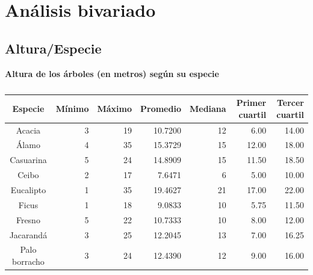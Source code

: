 \documentclass[11pt]{article}
\begin{document}

\newpage
\section{Análisis bivariado}

\subsection{Altura/Especie}

\begin{table}[h!]
  \begin{center}
    \caption*{\textbf{Altura de los árboles (en metros) según su especie}}
    \begin{tabular}{| c | r | r | r | r | r | r |}
      \hline
      \textbf{Especie} & \textbf{Mínimo} & \textbf{Máximo} & \textbf{Promedio} &
      \textbf{Mediana} & \textbf{Primer cuartil} & \textbf{Tercer cuartil}  \\ \hline
      Acacia & 3 & 19 & 10.7200 & 12 & 6.00 & 14.00 \\ \hline
	    Álamo & 4 & 35 & 15.3729 & 15 & 12.00 & 18.00 \\ \hline
	    Casuarina & 5 & 24 & 14.8909 & 15 & 11.50 & 18.50 \\ \hline
	    Ceibo & 2 & 17 & 7.6471 & 6 & 5.00 & 10.00 \\ \hline
	    Eucalipto & 1 & 35 & 19.4627 & 21 & 17.00 & 22.00 \\ \hline
	    Ficus & 1 & 18 & 9.0833 & 10 & 5.75 & 11.50 \\ \hline
	    Fresno & 5 & 22 & 10.7333 & 10 & 8.00 & 12.00 \\ \hline
	    Jacarandá & 3 & 25 & 12.2045 & 13 & 7.00 & 16.25 \\ \hline
	    Palo borracho & 3 & 24 & 12.4390 & 12 & 9.00 & 16.00 \\ \hline
    \end{tabular}
    \caption{}
    \label{tab:tablaAlturaEspecie}
  \end{center}
\end{table}
\end{document}
